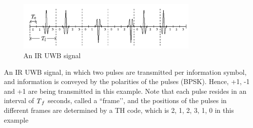 \documentclass[\main/main.tex]{subfiles}
\begin{document}
\begin{figure}[H]
    \centering
    \includegraphics[width=0.8\textwidth]{an_ir_uwb_signal}
    \caption{An IR UWB signal}
    \label{fig:an_ir_uwb_signal}
\end{figure}

An IR UWB signal, in which two pulses are transmitted per information symbol, and information is conveyed by the polarities of the pulses (BPSK). Hence, +1, -1 and +1 are being transmitted in this example. Note that each pulse resides in an interval of $T\textsubscript{$f$}$ seconds, called a “frame’’, and the positions of the pulses in different frames are determined by a TH code, which is {2, 1, 2, 3, 1, 0} in this example
\end{document}
